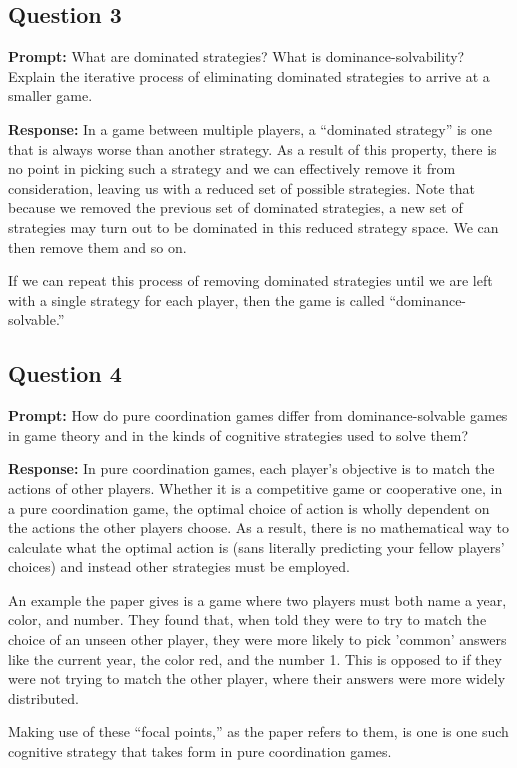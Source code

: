 \documentclass{article}
\begin{document}
\subsection*{Question 3}
\noindent\textbf{Prompt:} What are dominated strategies? What is dominance-solvability? Explain the iterative process of eliminating dominated strategies to arrive at a smaller game.
\bigskip

\noindent\textbf{Response:} In a game between multiple players, a ``dominated strategy'' is one that is always worse than another strategy. As a result of this property, there is no point in picking such a strategy and we can effectively remove it from consideration, leaving us with a reduced set of possible strategies. Note that because we removed the previous set of dominated strategies, a new set of strategies may turn out to be dominated in this reduced strategy space. We can then remove them and so on.

If we can repeat this process of removing dominated strategies until we are left with a single strategy for each player, then the game is called ``dominance-solvable.''

\subsection*{Question 4}
\noindent\textbf{Prompt:} How do pure coordination games differ from dominance-solvable games in game theory and in the kinds of cognitive strategies used to solve them?
\bigskip

\noindent\textbf{Response:} In pure coordination games, each player's objective is to match the actions of other players. Whether it is a competitive game or cooperative one, in a pure coordination game, the optimal choice of action is wholly dependent on the actions the other players choose. As a result, there is no mathematical way to calculate what the optimal action is (sans literally predicting your fellow players' choices) and instead other strategies must be employed.

An example the paper gives is a game where two players must both name a year, color, and number. They found that, when told they were to try to match the choice of an unseen other player, they were more likely to pick 'common' answers like the current year, the color red, and the number 1. This is opposed to if they were not trying to match the other player, where their answers were more widely distributed.

Making use of these ``focal points,'' as the paper refers to them, is one is one such cognitive strategy that takes form in pure coordination games.
\end{document}
